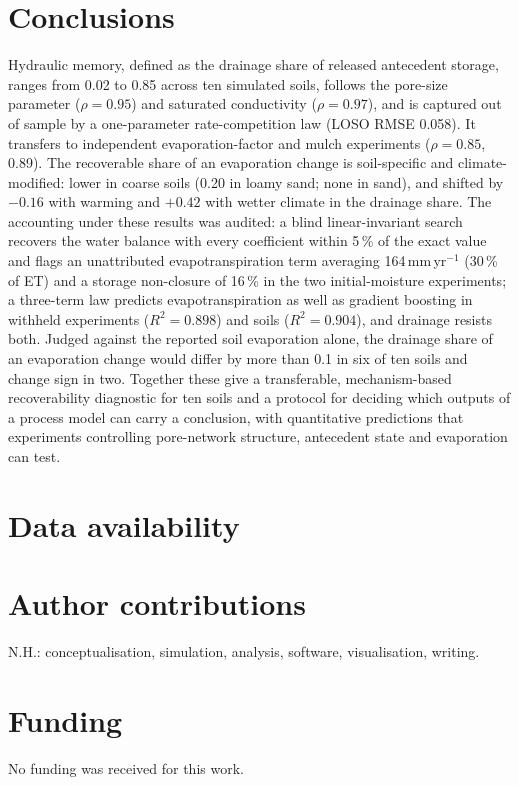 \section{Conclusions}
Hydraulic memory, defined as the drainage share of released antecedent storage, ranges from 0.02 to 0.85 across ten simulated soils, follows the pore-size parameter ($\rho=0.95$) and saturated conductivity ($\rho=0.97$), and is captured out of sample by a one-parameter rate-competition law (LOSO RMSE 0.058). It transfers to independent evaporation-factor and mulch experiments ($\rho=0.85$, 0.89). The recoverable share of an evaporation change is soil-specific and climate-modified: lower in coarse soils (0.20 in loamy sand; none in sand), and shifted by $-0.16$ with warming and $+0.42$ with wetter climate in the drainage share. The accounting under these results was audited: a blind linear-invariant search recovers the water balance with every coefficient within 5\,\% of the exact value and flags an unattributed evapotranspiration term averaging 164\,mm\,yr$^{-1}$ (30\,\% of ET) and a storage non-closure of 16\,\% in the two initial-moisture experiments; a three-term law predicts evapotranspiration as well as gradient boosting in withheld experiments ($R^2=0.898$) and soils ($R^2=0.904$), and drainage resists both. Judged against the reported soil evaporation alone, the drainage share of an evaporation change would differ by more than 0.1 in six of ten soils and change sign in two. Together these give a transferable, mechanism-based recoverability diagnostic for ten soils and a protocol for deciding which outputs of a process model can carry a conclusion, with quantitative predictions that experiments controlling pore-network structure, antecedent state and evaporation can test.

\section*{Data availability}
\dataavail

\section*{Author contributions}
N.H.: conceptualisation, simulation, analysis, software, visualisation, writing.

\section*{Funding}
No funding was received for this work.

